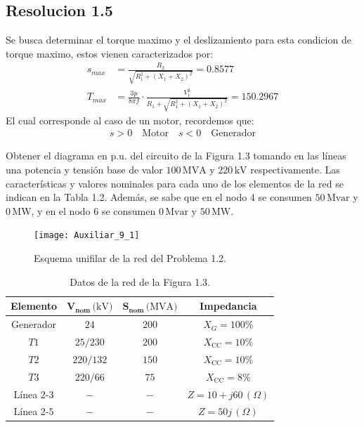 \documentclass[
  11pt,
  letterpaper,
   addpoints,
   answers
  ]{exam}
\begin{document}
\begin{questions}
\begin{solution}
        \subsection*{Resolucion 1.5}
        Se busca determinar el torque maximo y el deslizamiento para esta condicion de torque maximo, estos vienen caracterizados por:
        \begin{align}
            s_{max} &= \frac{R_{2}}{\sqrt{R_{1}^{2} + (X_{1} + X_{2})^{2}}} = 0.8577\\
            T_{max} &= \frac{3p}{8\pi f} \cdot \frac{V_{1}^{2}}{R_{1}+ \sqrt{R_{1}^{2} + (X_{1} + X_{2})^{2}}} = 150.2967
        \end{align}
        El cual corresponde al caso de un motor, recordemos que:
        \begin{align}
            s>0 \quad \text{Motor} \quad s<0 \quad \text{Generador}
        \end{align}
    \end{solution}
    \question Obtener el diagrama en p.u. del circuito de la Figura 1.3 tomando en las líneas una potencia y tensión base de valor \(100 \, \text{MVA}\) y \(220 \, \text{kV}\) respectivamente. Las características y valores nominales para cada uno de los elementos de la red se indican en la Tabla 1.2. Además, se sabe que en el nodo 4 se consumen \(50 \, \text{Mvar}\) y \(0 \, \text{MW}\), y en el nodo 6 se consumen \(0 \, \text{Mvar}\) y \(50 \, \text{MW}\).

    \begin{figure}[H]
        \centering
        \texttt{[image: Auxiliar\_9\_1]} 
        \caption{Esquema unifilar de la red del Problema 1.2.}
    \end{figure}
    
    \begin{table}[H]
        \centering
        \caption{Datos de la red de la Figura 1.3.}
        \begin{tabular}{|c|c|c|c|}
            \hline
            \textbf{Elemento} & \(\boldsymbol{V_{\text{nom}}} \, \text{(kV)}\) & \(\boldsymbol{S_{\text{nom}}} \, \text{(MVA)}\) & \textbf{Impedancia} \\ \hline
            Generador         & \(24\)         & \(200\)   & \(X_G = 100\%\) \\ \hline
            \(T1\)            & \(25/230\)     & \(200\)   & \(X_{\text{CC}} = 10\%\) \\ \hline
            \(T2\)            & \(220/132\)    & \(150\)   & \(X_{\text{CC}} = 10\%\) \\ \hline
            \(T3\)            & \(220/66\)     & \(75\)    & \(X_{\text{CC}} = 8\%\) \\ \hline
            Línea \(2\text{-}3\) & \(-\)        & \(-\)     & \(Z = 10 + j60 \, (\Omega)\) \\ \hline
            Línea \(2\text{-}5\) & \(-\)        & \(-\)     & \(Z = 50j \, (\Omega)\) \\ \hline
        \end{tabular}
    \end{table}
    

\end{questions}
\end{document}
